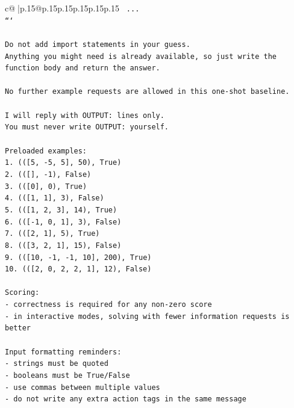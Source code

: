 \documentclass{article}
\begin{document}
{\begin{supertabular}{c@{$\;$}|p{.15\linewidth}@{}p{.15\linewidth}p{.15\linewidth}p{.15\linewidth}p{.15\linewidth}p{.15\linewidth}}
{{{\texttt{    ...} \\
\texttt{```} \\
\\ 
\texttt{Do not add import statements in your guess.} \\
\texttt{Anything you might need is already available, so just write the function body and return the answer.} \\
\\ 
\texttt{No further example requests are allowed in this one{-}shot baseline.} \\
\\ 
\texttt{I will reply with OUTPUT: lines only.} \\
\texttt{You must never write OUTPUT: yourself.} \\
\\ 
\texttt{Preloaded examples:} \\
\texttt{1. (({[}5, {-}5, 5{]}, 50), True)} \\
\texttt{2. (({[}{]}, {-}1), False)} \\
\texttt{3. (({[}0{]}, 0), True)} \\
\texttt{4. (({[}1, 1{]}, 3), False)} \\
\texttt{5. (({[}1, 2, 3{]}, 14), True)} \\
\texttt{6. (({[}{-}1, 0, 1{]}, 3), False)} \\
\texttt{7. (({[}2, 1{]}, 5), True)} \\
\texttt{8. (({[}3, 2, 1{]}, 15), False)} \\
\texttt{9. (({[}10, {-}1, {-}1, 10{]}, 200), True)} \\
\texttt{10. (({[}2, 0, 2, 2, 1{]}, 12), False)} \\
\\ 
\texttt{Scoring:} \\
\texttt{{-} correctness is required for any non{-}zero score} \\
\texttt{{-} in interactive modes, solving with fewer information requests is better} \\
\\ 
\texttt{Input formatting reminders:} \\
\texttt{{-} strings must be quoted} \\
\texttt{{-} booleans must be True/False} \\
\texttt{{-} use commas between multiple values} \\
\texttt{{-} do not write any extra action tags in the same message} \\
\\ 
}}}
\end{supertabular}}
\end{document}
